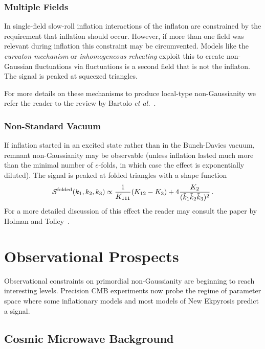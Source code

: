 \documentclass[12pt,letterpaper,rotate]{article}
\def\beq{\begin{equation}}
\def\eeq{\end{equation}}
\begin{document}
{\subsubsection{Multiple Fields}

In single-field slow-roll inflation interactions of the inflaton are constrained by the requirement that inflation should occur.
However, if more than one field was relevant during inflation this constraint may be circumvented. Models like the
{\it curvaton mechanism} \cite{Linde:1996gt, Lyth_etal03}  or {\it inhomogeneous reheating} \cite{Dvali:2003em, Kofman:2003nx} exploit this to create non-Gaussian fluctuations via fluctuations is a second field that is not the inflaton.
The
signal is peaked at squeezed triangles.

For more details on these mechanisms to produce local-type non-Gaussianity we refer the reader to the review by Bartolo {\it et al.}~\cite{NGreview}.

\subsubsection{Non-Standard Vacuum}

If inflation started in an excited state rather than in the Bunch-Davies vacuum, remnant non-Gaussianity may be observable \cite{Holman:2007na} (unless inflation lasted much more than the minimal number of $e$-folds, in which case the effect is exponentially diluted).
The
signal is peaked at folded triangles with a shape function
\beq
\label{equ:Sfolded}
{\cal S}^{\rm folded}(k_1,k_2,k_3) \propto \frac{1}{K_{111}} (K_{12} - K_3) + 4 \frac{K_2}{(\tilde k_1 \tilde k_2 \tilde k_3)^2}\, .
\eeq
For a more detailed discussion of this effect the reader may consult the paper by Holman and Tolley~\cite{Holman:2007na}.

 
\section{Observational Prospects}


Observational constraints on primordial non-Gaussianity are beginning to reach interesting levels.
Precision CMB experiments now probe the regime of parameter space where some inflationary models \cite{Linde:1996gt, Lyth_etal03, Dvali:2003em, Kofman:2003nx} and most models of New Ekpyrosis \cite{Creminelli:2007aq,Koyama_etal07,Buchbinder_etal07, Lehners:2007wc,Lehners:2008my, Koyama:2007ag, Koyama:2007mg}  predict a signal.

\subsection{Cosmic Microwave Background}

}
\end{document}

